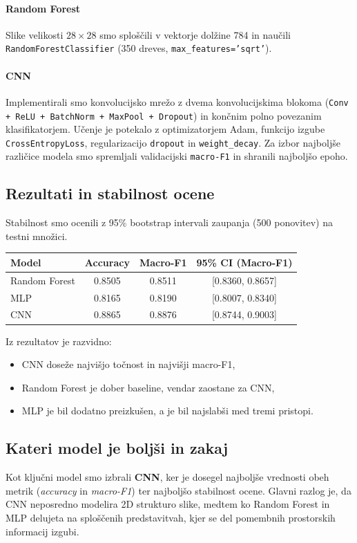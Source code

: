 \documentclass[12pt,a4paper]{article}
\begin{document}
\paragraph{Random Forest}
Slike velikosti $28\times 28$ smo sploščili v vektorje dolžine 784 in naučili \texttt{RandomForestClassifier} (350 dreves, \texttt{max\_features='sqrt'}).

\paragraph{CNN}
Implementirali smo konvolucijsko mrežo z dvema konvolucijskima blokoma (\texttt{Conv + ReLU + BatchNorm + MaxPool + Dropout}) in končnim polno povezanim klasifikatorjem. Učenje je potekalo z optimizatorjem Adam, funkcijo izgube \texttt{CrossEntropyLoss}, regularizacijo \texttt{dropout} in \texttt{weight\_decay}. Za izbor najboljše različice modela smo spremljali validacijski \texttt{macro-F1} in shranili najboljšo epoho.

\subsection*{Rezultati in stabilnost ocene}
Stabilnost smo ocenili z 95\% bootstrap intervali zaupanja (500 ponovitev) na testni množici.

\begin{center}
\begin{tabular}{>{\raggedright\arraybackslash}p{4cm}ccc}
\toprule
Model & Accuracy & Macro-F1 & 95\% CI (Macro-F1) \\
\midrule
Random Forest & 0.8505 & 0.8511 & [0.8360, 0.8657] \\
MLP & 0.8165 & 0.8190 & [0.8007, 0.8340] \\
CNN & 0.8865 & 0.8876 & [0.8744, 0.9003] \\
\bottomrule
\end{tabular}
\end{center}

Iz rezultatov je razvidno:
\begin{itemize}
    \item CNN doseže najvišjo točnost in najvišji macro-F1,
    \item Random Forest je dober baseline, vendar zaostane za CNN,
    \item MLP je bil dodatno preizkušen, a je bil najslabši med tremi pristopi.
\end{itemize}

\subsection*{Kateri model je boljši in zakaj}
Kot ključni model smo izbrali \textbf{CNN}, ker je dosegel najboljše vrednosti obeh metrik (\emph{accuracy} in \emph{macro-F1}) ter najboljšo stabilnost ocene. Glavni razlog je, da CNN neposredno modelira 2D strukturo slike, medtem ko Random Forest in MLP delujeta na sploščenih predstavitvah, kjer se del pomembnih prostorskih informacij izgubi.
\end{document}
